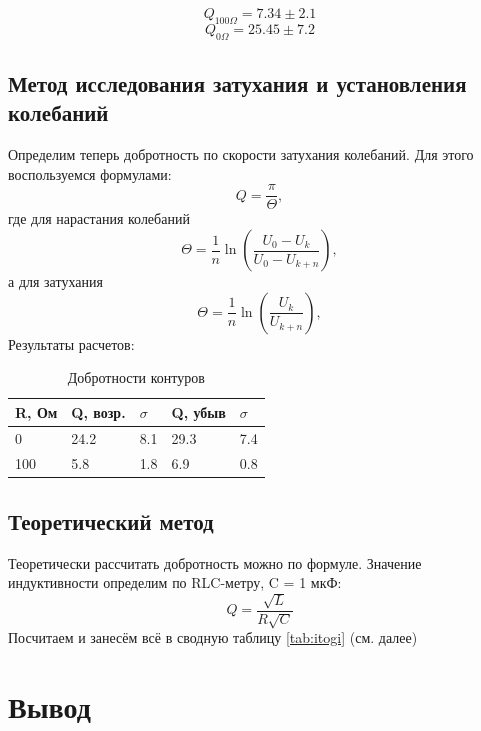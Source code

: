 \documentclass[a4paper, 12pt]{article}
\begin{document}
\begin{equation}
	Q_{100\Omega} = 7.34 \pm 2.1
\end{equation}
\begin{equation}
	Q_{0\Omega} = 25.45  \pm 7.2
\end{equation}

\subsection{Метод исследования затухания и установления колебаний}

Определим теперь добротность по скорости затухания колебаний. Для этого воспользуемся формулами:
\begin{equation}
	Q = \frac{\pi}{\Theta},
\end{equation}
где для нарастания колебаний
\begin{equation}
	\Theta = \frac{1}{n}\ln \left(\frac{U_{0} - U_{k}}{U_{0} - U_{k + n}}\right),
\end{equation}
а для затухания
\begin{equation}
	\Theta = \frac{1}{n}\ln \left(\frac{U_{k}}{U_{k + n}}\right),
\end{equation}
Результаты расчетов:
\begin{table}[h]
	\centering
	\begin{tabular}{|l|l|l|l|l|}
	\hline
	R, Ом & Q, возр. & $\sigma$ & Q, убыв & $\sigma$ \\ \hline
	0     & 24.2    & 8.1      & 29.3   & 7.4      \\ \hline
	100   & 5.8     & 1.8      & 6.9   & 0.8     \\ \hline
	\end{tabular}
	\caption{Добротности контуров}
	\label{tab:Qs}
\end{table}

\subsection{Теоретический метод}

Теоретически рассчитать добротность можно по формуле. Значение индуктивности определим по RLC-метру, C = 1 мкФ:
\begin{equation}
	Q = \frac{\sqrt{L}}{R\sqrt{C}}
\end{equation}
Посчитаем и занесём всё в сводную таблицу \ref{tab:itogi} (см. далее)

\section{Вывод}
\end{document}
